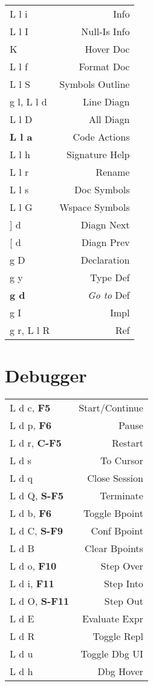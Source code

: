 \documentclass[
  ,landscape
  ,columns=4
]{cheatsheet}
\begin{document}
\begin{tabular}{lr}
	L l i          & Info               \\
	L l I          & Null-Is Info       \\
	K              & Hover Doc          \\
	L l f          & Format Doc         \\
	L l S          & Symbols Outline    \\
	g l, L l d     & Line Diagn         \\
	L l D          & All Diagn          \\
	\textbf{L l a} & Code Actions       \\
	L l h          & Signature Help     \\
	L l r          & Rename             \\
	L l s          & Doc Symbols        \\
	L l G          & Wspace Symbols     \\
	{]} d          & Diagn Next         \\
	{[} d          & Diagn Prev         \\
	g D            & Declaration        \\
	g y            & Type Def           \\
	\textbf{g d}   & \textit{Go to} Def \\
	g I            & Impl               \\
	g r, L l R     & Ref                \\
\end{tabular}

\section{Debugger}

\begin{tabular}{lr}
	L d c, \textbf{F5}    & Start/Continue \\
	L d p, \textbf{F6}    & Pause          \\
	L d r, \textbf{C-F5}  & Restart        \\
	L d s                 & To Cursor      \\
	L d q                 & Close Session  \\
	L d Q, \textbf{S-F5}  & Terminate      \\
	L d b, \textbf{F6}    & Toggle Bpoint  \\
	L d C, \textbf{S-F9}  & Conf Bpoint    \\
	L d B                 & Clear Bpoints  \\
	L d o, \textbf{F10}   & Step Over      \\
	L d i, \textbf{F11}   & Step Into      \\
	L d O, \textbf{S-F11} & Step Out       \\
	L d E                 & Evaluate Expr  \\
	L d R                 & Toggle Repl    \\
	L d u                 & Toggle Dbg UI  \\
	L d h                 & Dbg Hover      \\
\end{tabular}
\end{document}
